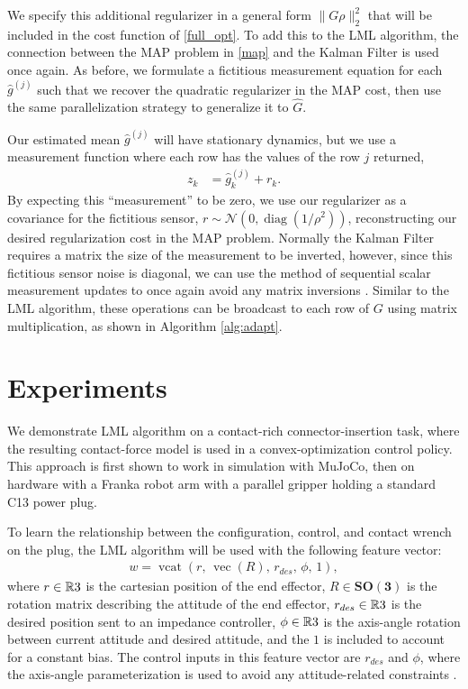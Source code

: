 We specify this additional regularizer in a general form $\|G\rho\|_2^2$ that will be included in the cost function of \eqref{full_opt}. To add this to the LML algorithm, the connection between the MAP problem in \eqref{map} and the Kalman Filter is used once again. As before, we formulate a fictitious measurement equation for each $\hat{g}^{(j)}$ such that we recover the quadratic regularizer in the MAP cost, then use the same parallelization strategy to generalize it to $\hat{G}$.

Our estimated mean $\hat{g}^{(j)}$ will have stationary dynamics, but we use a measurement function where each row has the values of the row $j$ returned,
%
\begin{align}
    z_{k} &= \hat{g}^{(j)}_k + r_k\label{kf_reg_2}.
\end{align}
%
By expecting this ``measurement'' to be zero, we use our regularizer as a covariance for the fictitious sensor, $r\sim \mathcal{N}(0, \operatorname{diag}(1/\rho^2))$, reconstructing our desired regularization cost in the MAP problem.  Normally the Kalman Filter requires a matrix the size of the measurement to be inverted, however, since this fictitious sensor noise is diagonal, we can use the method of sequential scalar measurement updates to once again avoid any matrix inversions \citep{kailath2000}. Similar to the LML algorithm, these operations can be broadcast to each row of $G$ using matrix multiplication, as shown in Algorithm \ref{alg:adapt}.
%
\section{Experiments}
%
We demonstrate LML algorithm on a contact-rich connector-insertion task, where the resulting contact-force model is used in a convex-optimization control policy. This approach is first shown to work in simulation with MuJoCo, then on hardware with a Franka robot arm with a parallel gripper holding a standard C13 power plug.

To learn the relationship between the configuration, control, and contact wrench on the plug, the LML algorithm will be used with the following feature vector:
%
\begin{align}
    w = \operatorname{vcat}(r,\, \operatorname{vec}(R),\, r_{des},\, \phi,\, 1),
\end{align}
%
where $r\in \mathbb{R}{3}$ is the cartesian position of the end effector, $R \in \mathbf{SO(3)}$ is the rotation matrix describing the attitude of the end effector, $r_{des} \in \mathbb{R}{3}$ is the desired position sent to an impedance controller, $\phi \in \mathbb{R}{3}$ is the axis-angle rotation between current attitude and desired attitude, and the $1$ is included to account for a constant bias. The control inputs in this feature vector are $r_{des}$ and $\phi$, where the axis-angle parameterization is used to avoid any attitude-related constraints \citep{jackson2021a}. 

